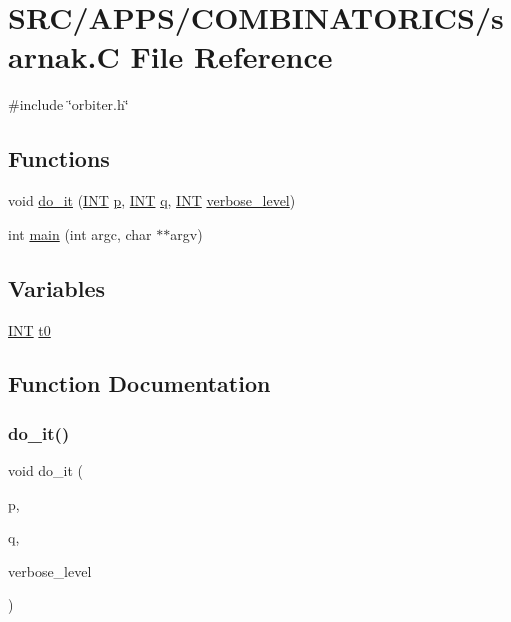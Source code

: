 \hypertarget{sarnak_8_c}{}\section{S\+R\+C/\+A\+P\+P\+S/\+C\+O\+M\+B\+I\+N\+A\+T\+O\+R\+I\+C\+S/sarnak.C File Reference}
\label{sarnak_8_c}
{\ttfamily \#include \char`\"{}orbiter.\+h\char`\"{}}\newline
\subsection*{Functions}
\begin{DoxyCompactItemize}
\item 
void \mbox{\hyperlink{sarnak_8_c_a765f49af6bc0f6958441ba0baea50fc7}{do\+\_\+it}} (\mbox{\hyperlink{galois_8h_a09fddde158a3a20bd2dcadb609de11dc}{I\+NT}} \mbox{\hyperlink{alphabet2_8_c_a533391314665d6bf1b5575e9a9cd8552}{p}}, \mbox{\hyperlink{galois_8h_a09fddde158a3a20bd2dcadb609de11dc}{I\+NT}} \mbox{\hyperlink{simeon_8_c_a92cbb483a3b27ae1a0dbfcb125ce216f}{q}}, \mbox{\hyperlink{galois_8h_a09fddde158a3a20bd2dcadb609de11dc}{I\+NT}} \mbox{\hyperlink{simeon_8_c_a818073fbcc2f439e7c56952f67386122}{verbose\+\_\+level}})
\item 
int \mbox{\hyperlink{sarnak_8_c_a3c04138a5bfe5d72780bb7e82a18e627}{main}} (int argc, char $\ast$$\ast$argv)
\end{DoxyCompactItemize}
\subsection*{Variables}
\begin{DoxyCompactItemize}
\item 
\mbox{\hyperlink{galois_8h_a09fddde158a3a20bd2dcadb609de11dc}{I\+NT}} \mbox{\hyperlink{sarnak_8_c_a4268f4fe222ffb119218a0199f5e1904}{t0}}
\end{DoxyCompactItemize}


\subsection{Function Documentation}
\mbox{\label{sarnak_8_c_a765f49af6bc0f6958441ba0baea50fc7}} 
\subsubsection{\texorpdfstring{do\+\_\+it()}{do\_it()}}
{\footnotesize\ttfamily void do\+\_\+it (\begin{DoxyParamCaption}\item[{\mbox{\hyperlink{galois_8h_a09fddde158a3a20bd2dcadb609de11dc}{I\+NT}}}]{p,  }\item[{\mbox{\hyperlink{galois_8h_a09fddde158a3a20bd2dcadb609de11dc}{I\+NT}}}]{q,  }\item[{\mbox{\hyperlink{galois_8h_a09fddde158a3a20bd2dcadb609de11dc}{I\+NT}}}]{verbose\+\_\+level }\end{DoxyParamCaption})}

